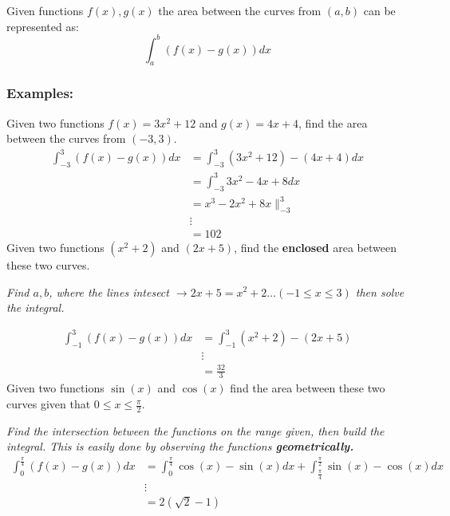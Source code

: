 \documentclass[a4paper]{article}
\begin{document}
  \begin{theorem}
    Given functions $f(x), g(x)$ the area between the curves from $(a,b)$ can be represented as:
    \begin{displaymath}
     \displaystyle\int_{a }^{b}  (f(x)-g(x))dx
    \end{displaymath}
  \end{theorem}
  \subsubsection{Examples:}
  Given two functions $f(x) = 3x^2 + 12$ and $g(x) = 4x+4$, find the area between the curves from $(-3,3)$.
  \begin{equation}
    \label{Example1}
    \begin{split}
      \displaystyle\int_{-3 }^{3 } (f(x)-g(x))dx &= \displaystyle\int_{-3 }^{3} (3x^2+12) - (4x+4) dx\\
                                               &= \displaystyle\int_{-3 }^{3} 3x^2 - 4x + 8 dx \\
                                               &= x^3-2x^2+8x \|^{3}_{-3} \\
                                               &\vdots\\
                                               &= 102
    \end{split}
  \end{equation}
  Given two functions $(x^2+2)$ and $(2x+5)$, find the \textbf{enclosed} area between these two curves.

 \textit{Find $a,b$, where the lines intesect $\rightarrow 2x+5 = x^2 + 2 \dots (-1 \le x \le 3)$ then solve the integral.} 

  \begin{equation}
    \label{eq:3}
    \begin{split}
      \displaystyle\int_{-1}^{3} (f(x)-g(x)) dx &= \displaystyle\int_{-1 }^{3 } (x^2 + 2)-(2x+5)\\
                                                &\vdots \\
                                                &= \frac{32 }{3}
    \end{split}
  \end{equation}
  Given two functions $\sin(x)$ and $\cos(x)$ find the area between these two curves given that $0\le x \le \frac{\pi }{2}$.
  
  \textit{Find the intersection between the functions on the range given, then build the integral. This is easily done by observing the functions \textbf{geometrically.}}
  \begin{equation}
    \begin{split}
      \displaystyle\int_{0 }^{\frac{\pi }{4}} (f(x)-g(x)) dx &= \displaystyle\int_{0 }^{\frac{\pi }{4}}\cos(x)-\sin(x)dx+\displaystyle\int_{\frac{\pi }{4}}^{\frac{\pi }{2}}\sin(x)-\cos(x)  dx \\ 
                                                             &\vdots\\
                                                             &= 2(\sqrt{2}-1)
    \end{split}
  \end{equation}
  \newpage
\end{document}
